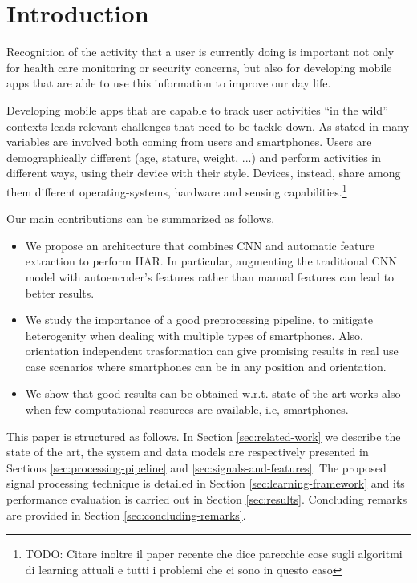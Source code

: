 
\section{Introduction}
\label{sec:introduction}

Recognition of the activity that a user is currently doing is
important not only for health care monitoring or security concerns,
but also for developing mobile apps that are able to use this
information to improve our day life.

Developing mobile apps that are capable to track user activities ``in
the wild'' contexts leads relevant challenges that need to be tackle
down. As stated in \cite{blunck2013heterogeneity} many variables are
involved both coming from users and smartphones. Users are
demographically different (age, stature, weight, ...) and perform
activities in different ways, using their device with their
style. Devices, instead, share among them different operating-systems,
hardware and sensing capabilities.\footnote{TODO: Citare inoltre il paper \cite{chen2020deep} recente che dice parecchie cose sugli algoritmi di learning attuali e tutti i problemi che ci sono in questo caso}

Our main contributions can be summarized as follows.
\begin{itemize}
  \item We propose an architecture that combines CNN and automatic
    feature extraction to perform HAR. In particular, augmenting the
    traditional CNN model with autoencoder's features rather than
    manual features can lead to better results.
  \item We study the importance of a good preprocessing pipeline, to
    mitigate heterogenity when dealing with multiple types of
    smartphones. Also, orientation independent trasformation can give
    promising results in real use case scenarios where smartphones can
    be in any position and orientation.
  \item We show that good results can be obtained
    w.r.t. state-of-the-art works also when few computational
    resources are available, i.e, smartphones.
\end{itemize}

This paper is structured as follows. In Section \ref{sec:related-work}
we describe the state of the art, the system and data models are
respectively presented in Sections \ref{sec:processing-pipeline} and
\ref{sec:signals-and-features}. The proposed signal processing
technique is detailed in Section \ref{sec:learning-framework} and its
performance evaluation is carried out in Section
\ref{sec:results}. Concluding remarks are provided in Section
\ref{sec:concluding-remarks}.

